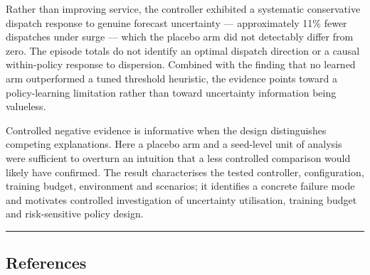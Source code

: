 \documentclass[
]{article}
\begin{document}
Rather than improving service, the controller exhibited a systematic
conservative dispatch response to genuine forecast uncertainty ---
approximately 11\% fewer dispatches under surge --- which the placebo
arm did not detectably differ from zero. The episode totals do not
identify an optimal dispatch direction or a causal within-policy
response to dispersion. Combined with the finding that no learned arm
outperformed a tuned threshold heuristic, the evidence points toward a
policy-learning limitation rather than toward uncertainty information
being valueless.

Controlled negative evidence is informative when the design
distinguishes competing explanations. Here a placebo arm and a
seed-level unit of analysis were sufficient to overturn an intuition
that a less controlled comparison would likely have confirmed. The
result characterises the tested controller, configuration, training
budget, environment and scenarios; it identifies a concrete failure mode
and motivates controlled investigation of uncertainty utilisation,
training budget and risk-sensitive policy design.

\begin{center}\rule{0.5\linewidth}{0.5pt}\end{center}

\subsection{References}\label{references}
\end{document}
